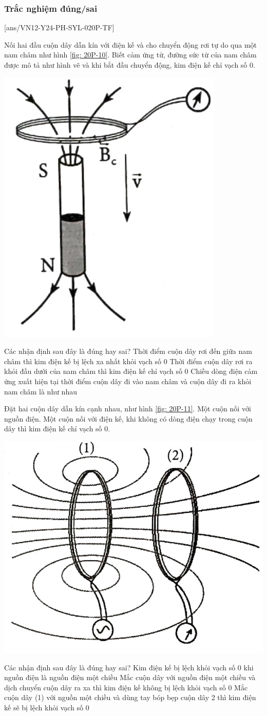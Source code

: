 \subsubsection{Trắc nghiệm đúng/sai}
[ans/VN12-Y24-PH-SYL-020P-TF]
\setcounter{ex}{0}
\begin{ex}
	Nối hai đầu cuộn dây dẫn kín với điện kế và cho chuyển động rơi tự do qua một nam châm như hình \ref{fig: 20P-10}. Biết cảm ứng từ, đường sức từ của nam châm được mô tả như hình vẽ và khi bắt đầu chuyển động, kim điện kế chỉ vạch số 0.
	\begin{center}
		\includegraphics[width=0.2\linewidth]{figs/VN12-Y24-PH-SYL-020P-10}
		\label{fig: 20P-10}
	\end{center}
	Các nhận định sau đây là đúng hay sai?
	{Thời điểm cuộn dây rơi đến giữa nam châm thì kim điện kế bị lệch xa nhất khỏi vạch số 0}
	{Thời điểm cuộn dây rơi ra khỏi đầu dưới của nam châm thì kim điện kế chỉ vạch số 0}
	{Chiều dòng điện cảm ứng xuất hiện tại thời điểm cuộn dây đi vào nam châm và cuộn dây đi ra khỏi nam châm là như nhau}
	\loigiai{
		
	}
\end{ex}
\begin{ex}
	Đặt hai cuộn dây dẫn kín cạnh nhau, như hình \ref{fig: 20P-11}. Một cuộn nối với nguồn điện. Một cuộn nối với điện kế, khi không có dòng điện chạy trong cuộn dây thì kim điện kế chỉ vạch số 0.
	\begin{center}
		\includegraphics[width=0.3\linewidth]{figs/VN12-Y24-PH-SYL-020P-11}
		\label{fig: 20P-11}
	\end{center}
	Các nhận định sau đây là đúng hay sai?
	{Kim điện kế bị lệch khỏi vạch số 0 khi nguồn điện là nguồn điện một chiều}
	{Mắc cuộn dây với nguồn điện một chiều và dịch chuyển cuộn dây ra xa thì kim điện kế không bị lệch khỏi vạch số 0}
	{\True Mắc cuộn dây (1) với nguồn một chiều và dùng tay bóp bẹp cuộn dây 2 thì kim điện kế sẽ bị lệch khỏi vạch số 0}
	\loigiai{}
\end{ex}
